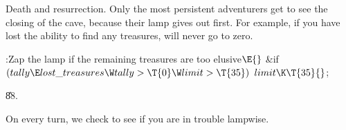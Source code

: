 Death and resurrection. Only the most persistent adventurers get to
see the closing of the cave, because their lamp gives out first.
For example, if you have lost the ability to find any treasures,
 will never go to zero.

\Y\B\4:Zap the lamp if the remaining treasures are too elusive\X${}\E{}$\6
\&{if} ${}(\\{tally}\E\\{lost\_treasures}\W\\{tally}>\T{0}\W\\{limit}>\T{35}){}$\1\5
${}\\{limit}\K\T{35}{}$;\2\par
\U88.\fi

On every turn, we check to see if you are in trouble lampwise.

